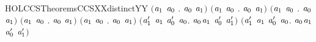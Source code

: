 \begin{SaveVerbatim}{HOLCCSTheoremsCCSXXdistinctYY}
   \ensuremath{(}\HOLSymConst{\HOLTokenForall{}}\ensuremath{\HOLBoundVar{a}\sb{\mathrm{1}}} \ensuremath{\HOLBoundVar{a}\sb{\mathrm{0}}} .   \HOLSymConst{\HOLTokenNotEqual{}} \ensuremath{\HOLBoundVar{a}\sb{\mathrm{0}}} \HOLSymConst{\ensuremath{+}} \ensuremath{\HOLBoundVar{a}\sb{\mathrm{1}}}\ensuremath{)} \HOLSymConst{\HOLTokenConj{}} \ensuremath{(}\HOLSymConst{\HOLTokenForall{}}\ensuremath{\HOLBoundVar{a}\sb{\mathrm{1}}} \ensuremath{\HOLBoundVar{a}\sb{\mathrm{0}}} .   \HOLSymConst{\HOLTokenNotEqual{}} \ensuremath{\HOLBoundVar{a}\sb{\mathrm{0}}} \HOLSymConst{\ensuremath{\mid}} \ensuremath{\HOLBoundVar{a}\sb{\mathrm{1}}}\ensuremath{)} \HOLSymConst{\HOLTokenConj{}}
   \ensuremath{(}\HOLSymConst{\HOLTokenForall{}}\ensuremath{\HOLBoundVar{a}\sb{\mathrm{1}}} \ensuremath{\HOLBoundVar{a}\sb{\mathrm{0}}} .   \HOLSymConst{\HOLTokenNotEqual{}}  \ensuremath{\HOLBoundVar{a}\sb{\mathrm{0}}} \ensuremath{\HOLBoundVar{a}\sb{\mathrm{1}}}\ensuremath{)} \HOLSymConst{\HOLTokenConj{}}
   \ensuremath{(}\HOLSymConst{\HOLTokenForall{}}\ensuremath{\HOLBoundVar{a}\sb{\mathrm{1}}} \ensuremath{\HOLBoundVar{a}\sb{\mathrm{0}}} .   \HOLSymConst{\HOLTokenNotEqual{}}  \ensuremath{\HOLBoundVar{a}\sb{\mathrm{0}}} \ensuremath{\HOLBoundVar{a}\sb{\mathrm{1}}}\ensuremath{)} \HOLSymConst{\HOLTokenConj{}}
   \ensuremath{(}\HOLSymConst{\HOLTokenForall{}}\ensuremath{\HOLBoundVar{a}\sb{\mathrm{1}}} \ensuremath{\HOLBoundVar{a}\sb{\mathrm{0}}} .   \HOLSymConst{\HOLTokenNotEqual{}}  \ensuremath{\HOLBoundVar{a}\sb{\mathrm{0}}} \ensuremath{\HOLBoundVar{a}\sb{\mathrm{1}}}\ensuremath{)} \HOLSymConst{\HOLTokenConj{}}
   \ensuremath{(}\HOLSymConst{\HOLTokenForall{}}\ensuremath{\HOLBoundVar{a}\sb{\mathrm{1}}\sp{\prime}} \ensuremath{\HOLBoundVar{a}\sb{\mathrm{1}}} \ensuremath{\HOLBoundVar{a}\sb{\mathrm{0}}\sp{\prime}} \ensuremath{\HOLBoundVar{a}\sb{\mathrm{0}}}. \ensuremath{\HOLBoundVar{a}\sb{\mathrm{0}}}\HOLSymConst{\ensuremath{\ldotp}}\ensuremath{\HOLBoundVar{a}\sb{\mathrm{1}}} \HOLSymConst{\HOLTokenNotEqual{}} \ensuremath{\HOLBoundVar{a}\sb{\mathrm{0}}\sp{\prime}} \HOLSymConst{\ensuremath{+}} \ensuremath{\HOLBoundVar{a}\sb{\mathrm{1}}\sp{\prime}}\ensuremath{)} \HOLSymConst{\HOLTokenConj{}}
   \ensuremath{(}\HOLSymConst{\HOLTokenForall{}}\ensuremath{\HOLBoundVar{a}\sb{\mathrm{1}}\sp{\prime}} \ensuremath{\HOLBoundVar{a}\sb{\mathrm{1}}} \ensuremath{\HOLBoundVar{a}\sb{\mathrm{0}}\sp{\prime}} \ensuremath{\HOLBoundVar{a}\sb{\mathrm{0}}}. \ensuremath{\HOLBoundVar{a}\sb{\mathrm{0}}}\HOLSymConst{\ensuremath{\ldotp}}\ensuremath{\HOLBoundVar{a}\sb{\mathrm{1}}} \HOLSymConst{\HOLTokenNotEqual{}} \ensuremath{\HOLBoundVar{a}\sb{\mathrm{0}}\sp{\prime}} \HOLSymConst{\ensuremath{\mid}} \ensuremath{\HOLBoundVar{a}\sb{\mathrm{1}}\sp{\prime}}\ensuremath{)} \HOLSymConst{\HOLTokenConj{}}

\end{SaveVerbatim}
